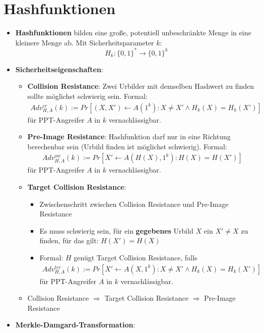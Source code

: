 \section{Hashfunktionen}%
\label{hash:sec:hashfunktionen}

\begin{itemize}
	\item \textbf{Hashfunktionen} bilden eine große, potentiell unbeschränkte Menge in eine kleinere Menge ab. Mit Sicherheitsparameter $k$:
	$$
		H_k: \{0, 1\}^* \rightarrow \{0, 1\}^k
	$$
	\item \textbf{Sicherheitseigenschaften}:
	\begin{itemize}
		\item \textbf{Collision Resistance}: Zwei Urbilder mit demselben Hashwert zu finden sollte möglichst schwierig sein. Formal:
		\begin{align*}
			Adv^{cr}_{H,A}(k):= Pr \left[ (X, X') \leftarrow A(1^k) : X \neq X'\land H_k(X) = H_k(X')\right]
		\end{align*}
		für PPT-Angreifer $A$ in $k$ vernachlässigbar.
		\item \textbf{Pre-Image Resistance}: Hashfunktion darf nur in eine Richtung berechenbar sein (Urbild finden ist möglichst schwierig). Formal:
		\begin{align*}
			Adv^{ow}_{H,A}(k):= Pr \left[ X' \leftarrow A(H(X), 1^k) : H(X) = H(X')\right]
		\end{align*}
		für PPT-Angreifer $A$ in $k$ vernachlässigbar.
		\item \textbf{Target Collision Resistance}:
		\begin{itemize}
			\item Zwischenschritt zwischen Collision Resistance und Pre-Image Resistance
			\item Es muss schwierig sein, für ein \textbf{gegebenes} Urbild $X$ ein $X' \neq X$ zu finden, für das gilt: $H(X') = H(X)$
			\item Formal: $H$ genügt Target Collision Resistance, falls
			\begin{align*}
				Adv^{tcr}_{H,A}(k):= Pr \left[ X' \leftarrow A(X, 1^k) : X \neq X' \land H_k(X) = H_k(X')\right] 
			\end{align*}
			für PPT-Angreifer $A$ in $k$ vernachlässigbar.
		\end{itemize}
		\item Collision Resistance $\Rightarrow$ Target Collision Resistance $\Rightarrow$ Pre-Image Resistance
	\end{itemize}
	\item \textbf{Merkle-Damgard-Transformation}:

\end{itemize}
